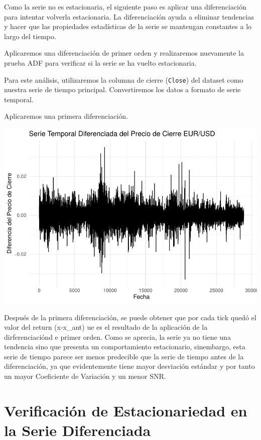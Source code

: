 \documentclass[
]{book}
\begin{document}
Como la serie no es estacionaria, el siguiente paso es aplicar una diferenciación para intentar volverla estacionaria. La diferenciación ayuda a eliminar tendencias y hacer que las propiedades estadísticas de la serie se mantengan constantes a lo largo del tiempo.

Aplicaremos una diferenciación de primer orden y realizaremos nuevamente la prueba ADF para verificar si la serie se ha vuelto estacionaria.

Para este análisis, utilizaremos la columna de cierre (\texttt{Close}) del dataset como nuestra serie de tiempo principal. Convertiremos los datos a formato de serie temporal.

Aplicaremos una primera diferenciación.

\includegraphics{bookdown_time_series_files/figure-latex/differencing-1-1.pdf}

Después de la primera diferenciación, se puede obtener que por cada tick quedó el valor del return (x-x\_ant) ue es el resultado de la aplicación de la dirferenciaciónd e primer orden. Como se aprecia, la serie ya no tiene una tendencia sino que presenta un comportamiento estacionario, sinembargo, esta serie de tiempo parece ser menos predecible que la serie de tiempo antes de la diferenciación, ya que evidentemente tiene mayor desviación estándar y por tanto un mayor Coeficiente de Variación y un menor SNR.

\section{Verificación de Estacionariedad en la Serie Diferenciada}\label{verificaciuxf3n-de-estacionariedad-en-la-serie-diferenciada}
\end{document}
